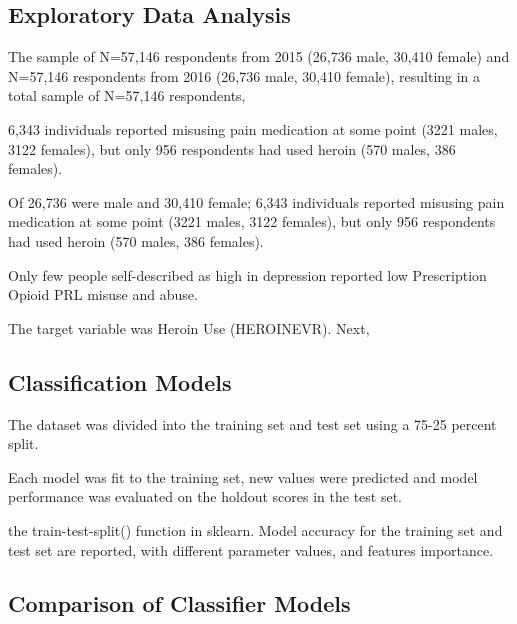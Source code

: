 \documentclass[sigconf]{acmart}
\begin{document}
\subsection{Exploratory Data Analysis}

The sample of N=57,146 respondents from 2015 (26,736 male, 30,410 female)
and N=57,146 respondents from 2016 (26,736 male, 30,410 female), resulting
in a total sample of N=57,146 respondents,

6,343 individuals reported misusing pain medication at some point
(3221 males, 3122 females), but only 956 respondents had used heroin (570 males, 
386 females). 

Of  26,736 were male and 30,410 
female; 6,343 individuals reported misusing pain medication at some point
(3221 males, 3122 females), but only 956 respondents had used heroin (570 males, 
386 females). 

Only few people 
self-described as high in depression reported low Prescription Opioid PRL 
misuse and abuse. 

 The target variable was Heroin Use (HEROINEVR). Next, 


\subsection{Classification Models}

The dataset was divided into the training set and test set using a 75-25 
percent split. 


Each model was fit to the training set, new values were predicted and model 
performance was evaluated on the holdout scores in the test set. 

the train-test-split() function in sklearn. Model accuracy for the training 
set and test 
set are reported, with different parameter values, and features importance. 



\subsection{Comparison of Classifier Models}
 
\end{document}
